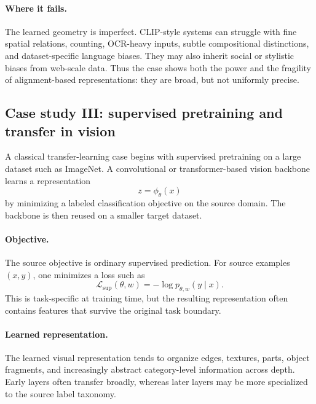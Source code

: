 \paragraph{Where it fails.}
The learned geometry is imperfect.
CLIP-style systems can struggle with fine spatial relations, counting, OCR-heavy inputs, subtle compositional distinctions, and dataset-specific language biases.
They may also inherit social or stylistic biases from web-scale data.
Thus the case shows both the power and the fragility of alignment-based representations: they are broad, but not uniformly precise.

\subsection*{Case study III: supervised pretraining and transfer in vision}

A classical transfer-learning case begins with supervised pretraining on a large dataset such as ImageNet.
A convolutional or transformer-based vision backbone learns a representation
\[
z = \phi_\theta(x)
\]
by minimizing a labeled classification objective on the source domain.
The backbone is then reused on a smaller target dataset.

\paragraph{Objective.}
The source objective is ordinary supervised prediction.
For source examples $(x,y)$, one minimizes a loss such as
\[
\mathcal{L}_{\mathrm{sup}}(\theta,w)
=
-\log p_{\theta,w}(y\mid x).
\]
This is task-specific at training time, but the resulting representation often contains features that survive the original task boundary.

\paragraph{Learned representation.}
The learned visual representation tends to organize edges, textures, parts, object fragments, and increasingly abstract category-level information across depth.
Early layers often transfer broadly, whereas later layers may be more specialized to the source label taxonomy.


